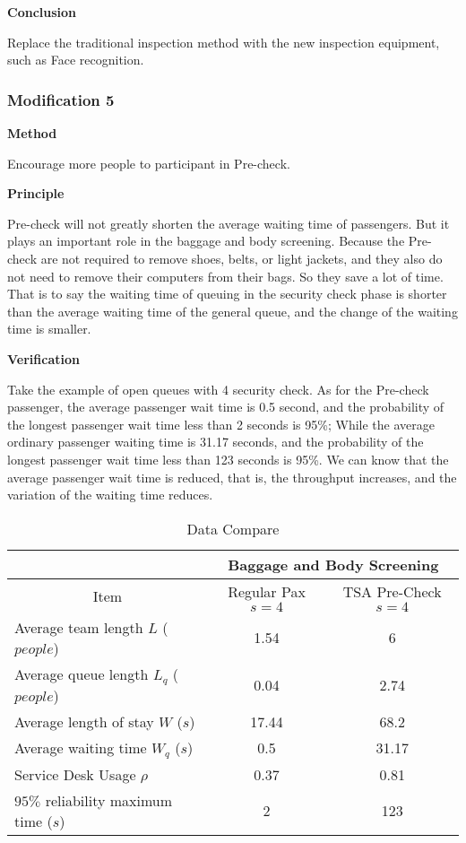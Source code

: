 \documentclass{mcmthesis}
\begin{document}
\par \textbf{Conclusion}
\par Replace the traditional inspection method with the new inspection equipment, such as Face recognition.


\subsubsection*{Modification 5}
\par \textbf{Method}
\par Encourage more people to participant in Pre-check.
\par \textbf{Principle}
\par Pre-check will not greatly shorten the average waiting time of passengers. But it plays an important role in the baggage and body screening. Because the Pre-check are not required to remove shoes, belts, or light jackets, and they also do not need to remove their computers from their bags. So they save a lot of time. That is to say the waiting time of queuing in the security check phase is shorter than the average waiting time of the general queue, and the change of the waiting time is smaller.
\par \textbf{Verification}
\par Take the example of open queues with 4 security check. As for the Pre-check passenger, the average passenger wait time is 0.5 second, and the probability of the longest passenger wait time less than 2 seconds is 95\%; While the average ordinary passenger waiting time is 31.17 seconds, and the probability of the longest passenger wait time less than 123 seconds is 95\%. We can know that the average passenger wait time is reduced, that is, the throughput increases, and the variation of the waiting time reduces.
\begin{table}[h]
\centering
\caption{Data Compare}
\label{Modification 5}
\begin{tabular}{@{}l|c|c@{}}
\toprule
\multicolumn{1}{c|}{}                 & \multicolumn{2}{c}{Baggage and Body Screening} \\ \midrule
\multicolumn{1}{c|}{Item}             & Regular Pax $s=4$     & TSA Pre-Check $s=4$     \\ \midrule
Average team length $L$ ($people$)    & 1.54                  & 6                       \\
Average queue length $L_q$ ($people$) & 0.04                  & 2.74                    \\
Average length of stay $W$ ($s$)      & 17.44                 & 68.2                    \\
Average waiting time $W_q$ ($s$)      & 0.5                   & 31.17                   \\
Service Desk Usage $\rho$             & 0.37                  & 0.81                    \\
$95\%$ reliability maximum time ($s$) & 2                     & 123                     \\ \bottomrule
\end{tabular}
\end{table}
\end{document}
